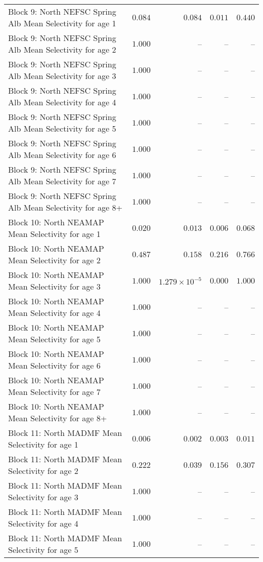 \documentclass[
]{article}
\begin{document}
\begin{landscape}
\begin{longtable}[t]{lrrrr}
Block 9: North NEFSC Spring Alb Mean Selectivity for age 1 & $0.084$ & $0.084$ & $0.011$ & $0.440$\\
Block 9: North NEFSC Spring Alb Mean Selectivity for age 2 & $1.000$ & -- & -- & --\\
Block 9: North NEFSC Spring Alb Mean Selectivity for age 3 & $1.000$ & -- & -- & --\\
Block 9: North NEFSC Spring Alb Mean Selectivity for age 4 & $1.000$ & -- & -- & --\\
\addlinespace
Block 9: North NEFSC Spring Alb Mean Selectivity for age 5 & $1.000$ & -- & -- & --\\
Block 9: North NEFSC Spring Alb Mean Selectivity for age 6 & $1.000$ & -- & -- & --\\
Block 9: North NEFSC Spring Alb Mean Selectivity for age 7 & $1.000$ & -- & -- & --\\
Block 9: North NEFSC Spring Alb Mean Selectivity for age 8+ & $1.000$ & -- & -- & --\\
Block 10: North NEAMAP Mean Selectivity for age 1 & $0.020$ & $0.013$ & $0.006$ & $0.068$\\
\addlinespace
Block 10: North NEAMAP Mean Selectivity for age 2 & $0.487$ & $0.158$ & $0.216$ & $0.766$\\
Block 10: North NEAMAP Mean Selectivity for age 3 & $1.000$ & $1.279\times 10^{-5}$ & $0.000$ & $1.000$\\
Block 10: North NEAMAP Mean Selectivity for age 4 & $1.000$ & -- & -- & --\\
Block 10: North NEAMAP Mean Selectivity for age 5 & $1.000$ & -- & -- & --\\
Block 10: North NEAMAP Mean Selectivity for age 6 & $1.000$ & -- & -- & --\\
\addlinespace
Block 10: North NEAMAP Mean Selectivity for age 7 & $1.000$ & -- & -- & --\\
Block 10: North NEAMAP Mean Selectivity for age 8+ & $1.000$ & -- & -- & --\\
Block 11: North MADMF Mean Selectivity for age 1 & $0.006$ & $0.002$ & $0.003$ & $0.011$\\
Block 11: North MADMF Mean Selectivity for age 2 & $0.222$ & $0.039$ & $0.156$ & $0.307$\\
Block 11: North MADMF Mean Selectivity for age 3 & $1.000$ & -- & -- & --\\
\addlinespace
Block 11: North MADMF Mean Selectivity for age 4 & $1.000$ & -- & -- & --\\
Block 11: North MADMF Mean Selectivity for age 5 & $1.000$ & -- & -- & --\\

\end{longtable}
\end{landscape}
\end{document}
